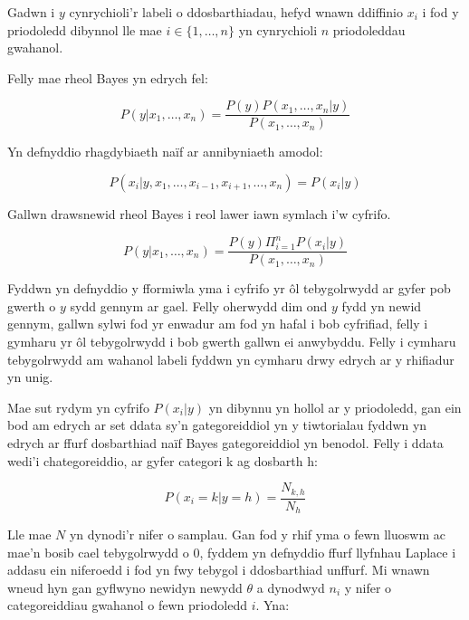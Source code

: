 Gadwn i $y$ cynrychioli'r labeli o ddosbarthiadau, hefyd wnawn ddiffinio $x_{i}$ i fod y priodoledd dibynnol lle mae $i \in \{ 1, \dots, n \}$ yn cynrychioli $n$ priodoleddau gwahanol.

Felly mae rheol Bayes yn edrych fel:

\begin{equation}\label{eqn:ol_tebygolrwydd}
P(y|x_{1}, \dots, x_{n}) = \frac{P(y)P(x_{1}, \dots, x_{n}|y)}{P(x_{1}, \dots, x_{n})}
\end{equation}

Yn defnyddio rhagdybiaeth na\"{i}f ar annibyniaeth amodol:

\begin{equation}\label{eqn:tebygolrwydd_amodol}
P(x_{i}|y, x_{1}, \dots, x_{i-1}, x_{i+1}, \dots, x_{n}) = P(x_{i}|y) 
\end{equation}

Gallwn drawsnewid rheol Bayes i reol lawer iawn symlach i'w cyfrifo.

\begin{equation}\label{eqn:rheol_bayes}
P(y|x_{1}, \dots, x_{n}) = \frac{P(y)\Pi^{n}_{i=1} P(x_{i}|y)}{P(x_{1}, \dots, x_{n})}
\end{equation}

Fyddwn yn defnyddio y fformiwla yma i cyfrifo yr \^{o}l tebygolrwydd ar gyfer pob gwerth o $y$ sydd gennym ar gael. Felly oherwydd dim ond $y$ fydd yn newid gennym, gallwn sylwi fod yr enwadur am fod yn hafal i bob cyfrifiad, felly i gymharu yr \^{o}l tebygolrwydd i bob gwerth gallwn ei anwybyddu. Felly i cymharu tebygolrwydd am wahanol labeli fyddwn yn cymharu drwy edrych ar y rhifiadur yn unig.

Mae sut rydym yn cyfrifo $P(x_{i}|y)$ yn dibynnu yn hollol ar y priodoledd, gan ein bod am edrych ar set ddata sy'n gategoreiddiol yn y tiwtorialau fyddwn yn edrych ar ffurf dosbarthiad na\"{i}f Bayes gategoreiddiol yn benodol. Felly i ddata wedi'i chategoreiddio, ar gyfer categori k ag dosbarth h:

\begin{equation}\label{eqn:naif-bayes-categoreiddiol}
P(x_{i} = k|y = h) = \frac{N_{k,h}}{N_{h}}
\end{equation}

Lle mae $N$ yn dynodi'r nifer o samplau. Gan fod y rhif yma o fewn lluoswm ac mae'n bosib cael tebygolrwydd o $0$, fyddem yn defnyddio ffurf llyfnhau Laplace i addasu ein niferoedd i fod yn fwy tebygol i ddosbarthiad unffurf. Mi wnawn wneud hyn gan gyflwyno newidyn newydd $\theta$ a dynodwyd $n_{i}$ y nifer o categoreiddiau gwahanol o fewn priodoledd $i$. Yna:

